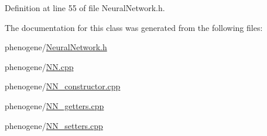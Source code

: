 Definition at line 55 of file Neural\-Network.\-h.



The documentation for this class was generated from the following files\-:\begin{DoxyCompactItemize}
\item 
phenogene/\hyperlink{a00014}{Neural\-Network.\-h}\item 
phenogene/\hyperlink{a00015}{N\-N.\-cpp}\item 
phenogene/\hyperlink{a00016}{N\-N\-\_\-constructor.\-cpp}\item 
phenogene/\hyperlink{a00017}{N\-N\-\_\-getters.\-cpp}\item 
phenogene/\hyperlink{a00018}{N\-N\-\_\-setters.\-cpp}\end{DoxyCompactItemize}
